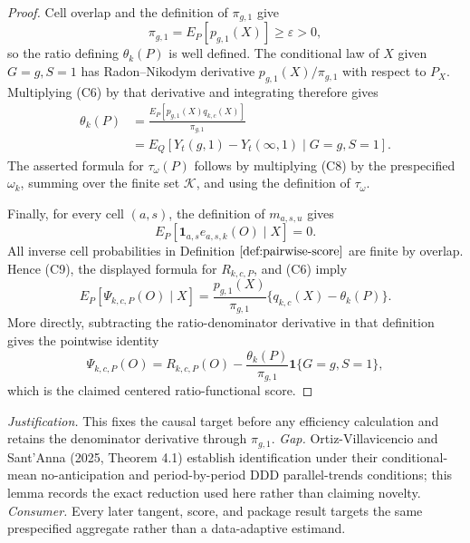 \documentclass{article}
\begin{document}
\begin{proof}
Cell overlap and the definition of \(\pi_{g,1}\) give
\[
\pi_{g,1}=E_P[p_{g,1}(X)]\ge\varepsilon>0,
\tag{C7}
\]
so the ratio defining \(\theta_k(P)\) is well defined.  The conditional law of \(X\) given \(G=g,S=1\) has Radon--Nikodym derivative \(p_{g,1}(X)/\pi_{g,1}\) with respect to \(P_X\).  Multiplying (C6) by that derivative and integrating therefore gives
\[
\begin{aligned}
\theta_k(P)
&=\frac{E_P[p_{g,1}(X)q_{k,c}(X)]}{\pi_{g,1}}\\
&=E_Q[Y_t(g,1)-Y_t(\infty,1)\mid G=g,S=1].
\end{aligned}
\tag{C8}
\]
The asserted formula for \(\tau_\omega(P)\) follows by multiplying (C8) by the prespecified \(\omega_k\), summing over the finite set \(\mathcal K\), and using the definition of \(\tau_\omega\).

Finally, for every cell \((a,s)\), the definition of \(m_{a,s,u}\) gives
\[
E_P[\mathbf 1_{a,s}e_{a,s,k}(O)\mid X]=0.
\tag{C9}
\]
All inverse cell probabilities in Definition \(\ref{def:pairwise-score}\) are finite by overlap.  Hence (C9), the displayed formula for \(R_{k,c,P}\), and (C6) imply
\[
E_P[\Psi_{k,c,P}(O)\mid X]
=\frac{p_{g,1}(X)}{\pi_{g,1}}
\{q_{k,c}(X)-\theta_k(P)\}.
\tag{C10}
\]
More directly, subtracting the ratio-denominator derivative in that definition gives the pointwise identity
\[
\Psi_{k,c,P}(O)
=R_{k,c,P}(O)
-\frac{\theta_k(P)}{\pi_{g,1}}\mathbf 1\{G=g,S=1\},
\]
which is the claimed centered ratio-functional score.
\end{proof}
\par\smallskip\noindent \textit{Justification.} This fixes the causal target before any efficiency calculation and retains the denominator derivative through \(\pi_{g,1}\). \textit{Gap.} Ortiz-Villavicencio and Sant'Anna (2025, Theorem 4.1) establish identification under their conditional-mean no-anticipation and period-by-period DDD parallel-trends conditions; this lemma records the exact reduction used here rather than claiming novelty. \textit{Consumer.} Every later tangent, score, and package result targets the same prespecified aggregate rather than a data-adaptive estimand.
\end{document}
